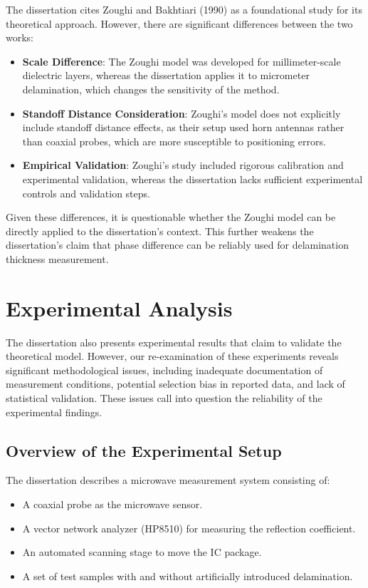 \documentclass[10pt,twocolumn]{article}
\begin{document}
The dissertation cites Zoughi and Bakhtiari (1990) \cite{2} as a foundational study for its theoretical approach. However, there are significant differences between the two works:

\begin{itemize}
    \item \textbf{Scale Difference}: The Zoughi model was developed for millimeter-scale dielectric layers, whereas the dissertation applies it to micrometer delamination, which changes the sensitivity of the method.
    \item \textbf{Standoff Distance Consideration}: Zoughi’s model does not explicitly include standoff distance effects, as their setup used horn antennas rather than coaxial probes, which are more susceptible to positioning errors.
    \item \textbf{Empirical Validation}: Zoughi’s study included rigorous calibration and experimental validation, whereas the dissertation lacks sufficient experimental controls and validation steps.
\end{itemize}

Given these differences, it is questionable whether the Zoughi model can be directly applied to the dissertation’s context. This further weakens the dissertation’s claim that phase difference can be reliably used for delamination thickness measurement.


\section{Experimental Analysis}

The dissertation also presents experimental results that claim to validate the theoretical model. However, our re-examination of these experiments reveals significant methodological issues, including inadequate documentation of measurement conditions, potential selection bias in reported data, and lack of statistical validation. These issues call into question the reliability of the experimental findings.

\subsection{Overview of the Experimental Setup}

The dissertation describes a microwave measurement system consisting of:
\begin{itemize}
    \item A coaxial probe as the microwave sensor.
    \item A vector network analyzer (HP8510) for measuring the reflection coefficient.
    \item An automated scanning stage to move the IC package.
    \item A set of test samples with and without artificially introduced delamination.
\end{itemize}
\end{document}
